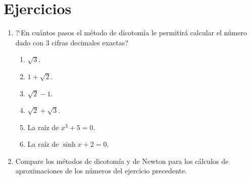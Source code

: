 \section{Ejercicios}
\begingroup
\small
\begin{multicols}{2}
\begin{enumerate}
\item ?`En cuántos pasos el método de dicotomía le permitirá calcular el número dado con $3$ cifras decimales exactas?
    \begin{enumerate}
    \item $\sqrt{3}$.
    \item $1 + \sqrt{2}$.
    \item $\sqrt{2} - 1$.
    \item $\sqrt{2} + \sqrt{3}$.
    \item La raíz de $x^3 + 5 = 0$.
    \item La raíz de $\sinh x + 2 = 0$.
    \end{enumerate}

\item Compare los métodos de dicotomía y de Newton para los cálculos de aproximaciones de los números del ejercicio precedente.
\end{enumerate}
\end{multicols}
\endgroup
%
%
%
